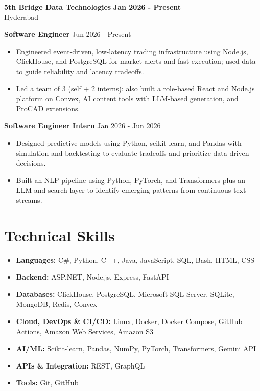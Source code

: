 \documentclass[a4paper,11pt]{article}
\newcommand{\resumeItem}[1]{\item \small{#1}}
\newcommand{\resumeSubheading}[4]{%
  \textbf{#1} \hfill \textbf{#2} \\
{#3} \hfill {#4}
}
\newcommand{\resumeSubHeadingListStart}{\begin{itemize}}
\newcommand{\resumeSubHeadingListEnd}{\end{itemize}}
\begin{document}
\resumeSubheading
{5th Bridge Data Technologies}{Jan 2026 - Present}
{Hyderabad}{}

\textbf{Software Engineer} \hfill {Jun 2026 - Present}
\resumeSubHeadingListStart
\resumeItem{Engineered event-driven, low-latency trading infrastructure using Node.js, ClickHouse, and PostgreSQL for market alerts and fast execution; used data to guide reliability and latency tradeoffs.}
\resumeItem{Led a team of 3 (self + 2 interns); also built a role-based React and Node.js platform on Convex, AI content tools with LLM-based generation, and ProCAD extensions.}
\resumeSubHeadingListEnd

\textbf{Software Engineer Intern} \hfill {Jan 2026 - Jun 2026}
\resumeSubHeadingListStart
\resumeItem{Designed predictive models using Python, scikit-learn, and Pandas with simulation and backtesting to evaluate tradeoffs and prioritize data-driven decisions.}
\resumeItem{Built an NLP pipeline using Python, PyTorch, and Transformers plus an LLM and search layer to identify emerging patterns from continuous text streams.}
\resumeSubHeadingListEnd


\section*{Technical Skills}
\begin{itemize}
\item \textbf{Languages:} C\#, Python, C++, Java, JavaScript, SQL, Bash, HTML, CSS
\item \textbf{Backend:} ASP.NET, Node.js, Express, FastAPI
\item \textbf{Databases:} ClickHouse, PostgreSQL, Microsoft SQL Server, SQLite, MongoDB, Redis, Convex
\item \textbf{Cloud, DevOps \& CI/CD:} Linux, Docker, Docker Compose, GitHub Actions, Amazon Web Services, Amazon S3
\item \textbf{AI/ML:} Scikit-learn, Pandas, NumPy, PyTorch, Transformers, Gemini API
\item \textbf{APIs \& Integration:} REST, GraphQL
\item \textbf{Tools:} Git, GitHub
\end{itemize}


\end{document}

